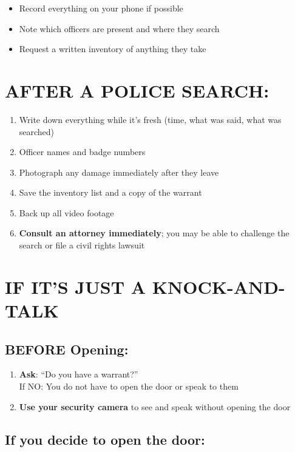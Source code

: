 \documentclass[10pt,letterpaper,twocolumn]{article}
\begin{document}
\begin{itemize}[leftmargin=*]
    \item Record everything on your phone if possible
    \item Note which officers are present and where they search
    \item Request a written inventory of anything they take
\end{itemize}

\section{AFTER A POLICE SEARCH:}

\begin{enumerate}[leftmargin=*]
    \item Write down everything while it's fresh (time, what was said, what was searched)
    \item Officer names and badge numbers
    \item Photograph any damage immediately after they leave
    \item Save the inventory list and a copy of the warrant
    \item Back up all video footage
    \item \textbf{Consult an attorney immediately}; you may be able to challenge the search or file a civil rights lawsuit
\end{enumerate}

\section{IF IT'S JUST A KNOCK-AND-TALK}

\subsection{BEFORE Opening:}

\begin{enumerate}[leftmargin=*]
    \item \textbf{Ask}: ``Do you have a warrant?'' \\
    If NO: You do not have to open the door or speak to them
    \item \textbf{Use your security camera} to see and speak without opening the door
\end{enumerate}

\subsection{If you decide to open the door:}
\end{document}
